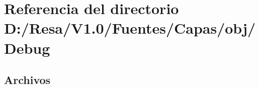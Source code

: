 \section{Referencia del directorio D\+:/\+Resa/\+V1.0/\+Fuentes/\+Capas/obj/\+Debug}
\label{dir_a94f60a1a01af08e565d431787c00912}
\subsection*{Archivos}
\begin{DoxyCompactItemize}
\end{DoxyCompactItemize}
